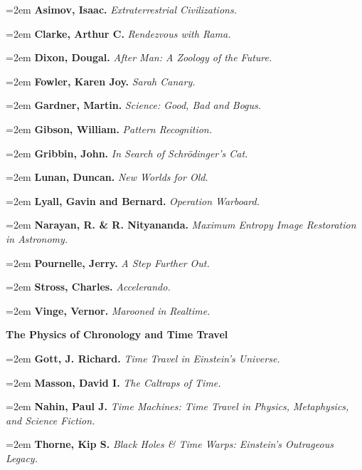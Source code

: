 \par\noindent\hangindent=2em {\bf Asimov, Isaac.} {\it Extraterrestrial Civilizations.} \par
\par\noindent\hangindent=2em {\bf Clarke, Arthur C.} {\it Rendezvous with Rama.} \par
\par\noindent\hangindent=2em {\bf Dixon, Dougal.} {\it After Man: A Zoology of the Future.} \par
\par\noindent\hangindent=2em {\bf Fowler, Karen Joy.} {\it Sarah Canary.} \par
\par\noindent\hangindent=2em {\bf Gardner, Martin.} {\it Science: Good, Bad and Bogus.} \par
\par\noindent\hangindent=2em {\bf Gibson, William.} {\it Pattern Recognition.} \par
\par\noindent\hangindent=2em {\bf Gribbin, John.} {\it In Search of Schrödinger's Cat.} \par
\par\noindent\hangindent=2em {\bf Lunan, Duncan.} {\it New Worlds for Old.} \par
\par\noindent\hangindent=2em {\bf Lyall, Gavin and Bernard.} {\it Operation Warboard.} \par
\par\noindent\hangindent=2em {\bf Narayan, R. \& R. Nityananda.} {\it Maximum Entropy Image Restoration in Astronomy.} \par
\par\noindent\hangindent=2em {\bf Pournelle, Jerry.} {\it A Step Further Out.} \par
\par\noindent\hangindent=2em {\bf Stross, Charles.} {\it Accelerando.} \par
\par\noindent\hangindent=2em {\bf Vinge, Vernor.} {\it Marooned in Realtime.} \par

\bigskip
{\bf The Physics of Chronology and Time Travel} \par\smallskip

\par\noindent\hangindent=2em {\bf Gott, J. Richard.} {\it Time Travel in Einstein's Universe.} \par
\par\noindent\hangindent=2em {\bf Masson, David I.} {\it The Caltraps of Time.} \par
\par\noindent\hangindent=2em {\bf Nahin, Paul J.} {\it Time Machines: Time Travel in Physics, Metaphysics, and Science Fiction.} \par
\par\noindent\hangindent=2em {\bf Thorne, Kip S.} {\it Black Holes \& Time Warps: Einstein's Outrageous Legacy.} \par

